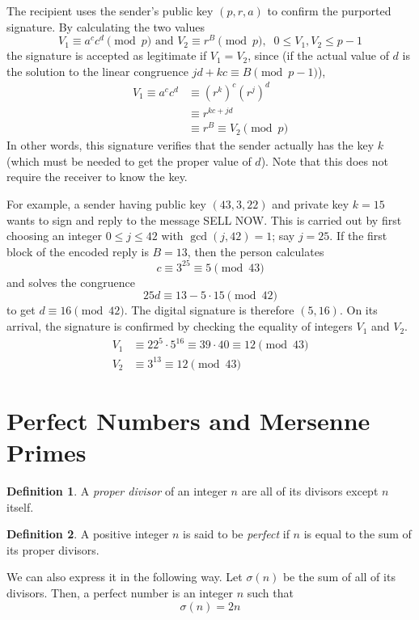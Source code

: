 \documentclass{article}
\theoremstyle{remark}
\theoremstyle{definition}
\newtheorem{definition}{Definition}[section]
\begin{document}
The recipient uses the sender's public key $(p, r, a)$ to confirm the purported signature. By calculating the two values 
\[V_1 \equiv a^c c^d \pmod{p} \text{ and } V_2 \equiv r^B \pmod{p}, \;\; 0 \leq V_1, V_2 \leq p-1\]
the signature is accepted as legitimate if $V_1 = V_2$, since (if the actual value of $d$ is the solution to the linear congruence $jd + kc \equiv B \pmod{p-1}$), 
\begin{align*}
    V_1 \equiv a^c c^d & \equiv (r^k)^c (r^j)^d \\
    & \equiv r^{kc + jd} \\
    & \equiv r^B \equiv V_2 \pmod{p}
\end{align*}
In other words, this signature verifies that the sender actually has the key $k$ (which must be needed to get the proper value of $d$). Note that this does not require the receiver to know the key. 

For example, a sender having public key $(43, 3, 22)$ and private key $k=15$ wants to sign and reply to the message SELL NOW. This is carried out by first choosing an integer $0 \leq j \leq 42$ with $\gcd(j, 42) = 1$; say $j=25$. If the first block of the encoded reply is $B=13$, then the person calculates
\[c \equiv 3^{25} \equiv 5 \pmod{43}\]
and solves the congruence 
\[25 d \equiv 13 - 5 \cdot 15 \pmod{42}\]
to get $d \equiv 16 \pmod{42}$. The digital signature is therefore $(5, 16)$. On its arrival, the signature is confirmed by checking the equality of integers $V_1$ and $V_2$. 
\begin{align*}
    V_1 & \equiv 22^5 \cdot 5^{16} \equiv 39 \cdot 40 \equiv 12 \pmod{43} \\
    V_2 & \equiv 3^{13} \equiv 12 \pmod{43}
\end{align*}


\section{Perfect Numbers and Mersenne Primes}
\begin{definition}
A \textit{proper divisor} of an integer $n$ are all of its divisors except $n$ itself. 
\end{definition}

\begin{definition}
A positive integer $n$ is said to be \textit{perfect} if $n$ is equal to the sum of its proper divisors. 
\end{definition}

We can also express it in the following way. Let $\sigma(n)$ be the sum of all of its divisors. Then, a perfect number is an integer $n$ such that
\[\sigma(n) = 2n\]
\end{document}
